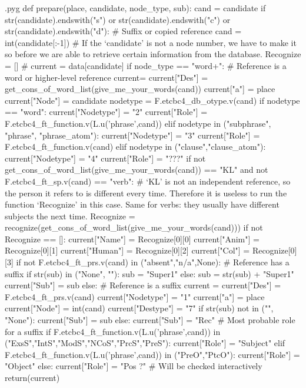 \documentclass{report}
\makeatletter
\newenvironment{python}{%
  \VerbatimEnvironment
  \minted@resetoptions
  \setkeys{minted@opt}{}
      \begin{VerbatimOut}{\jobname.pyg}}
{%
      \end{VerbatimOut}
      \minted@pygmentize{python}
      \DeleteFile{\jobname.pyg}}
\makeatother
\begin{document}
\begin{python}
def prepare(place, candidate, node_type, sub):
    cand = candidate
    if str(candidate).endswith("s") or str(candidate).endswith("c") or str(candidate).endswith("d"): # Suffix or copied reference
        cand = int(candidate[:-1]) # If the `candidate' is not a node number, we have to make it so before we are able to retrieve certain information from the database.
    Recognize = []
#    current = data[candidate]
    if node_type == "word+": # Reference is a word or higher-level reference
        current= {}
        current["Des"] = get_cons_of_word_list(give_me_your_words(cand))
        current["a"] = place
        current["Node"] = candidate
        nodetype = F.etcbc4_db_otype.v(cand)
        if nodetype == "word":
            current["Nodetype"] = "2"
            current["Role"] = F.etcbc4_ft_function.v(L.u('phrase',cand))
        elif nodetype in ("subphrase", "phrase", "phrase_atom"):
            current["Nodetype"] = "3"
            current["Role"] = F.etcbc4_ft_function.v(cand)
        elif nodetype in ("clause","clause_atom"):
            current["Nodetype"] = "4"
            current["Role"] = "???"
        if not get_cons_of_word_list(give_me_your_words(cand)) == "KL" and not F.etcbc4_ft_sp.v(cand) == "verb": # `KL' is not an independent reference, so the person it refers to is different every time. Therefore it is useless to run the function `Recognize' in this case. Same for verbs: they usually have different subjects the next time.
            Recognize = recognize(get_cons_of_word_list(give_me_your_words(cand)))
        if not Recognize == []:
            current["Name"] = Recognize[0][0]
            current["Anim"] = Recognize[0][1]
            current["Human"] = Recognize[0][2]
            current["Col"] = Recognize[0][3]
        if not F.etcbc4_ft_prs.v(cand) in ("absent","n/a",None): # Reference has a suffix
            if str(sub) in ("None", ""):
                sub = "Super1"
            else:
                sub = str(sub) + "Super1"
        current["Sub"] = sub
    else: # Reference is a suffix
        current = {}
        current["Des"] = F.etcbc4_ft_prs.v(cand)
        current["Nodetype"] = "1"
        current["a"] = place
        current["Node"] = int(cand)
        current["Destype"] = "7"
        if str(sub) not in ("", "None"):
            current["Sub"] = sub
        else:
            current["Sub"] = "Rec" # Most probable role for a suffix
        if F.etcbc4_ft_function.v(L.u('phrase',cand)) in ("ExsS","IntS","ModS","NCoS","PrcS","PreS"):
            current["Role"] = "Subject"
        elif F.etcbc4_ft_function.v(L.u('phrase',cand)) in ("PreO","PtcO"):
            current["Role"] = "Object"
        else:
            current["Role"] = "Pos ?" # Will be checked interactively
    return(current)

\end{python}
\end{document}
